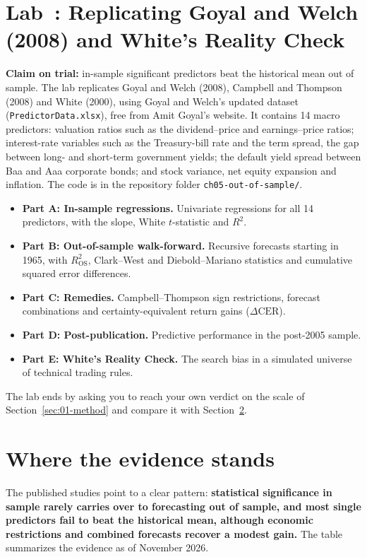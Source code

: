\section{Lab~\thechapter: Replicating Goyal and Welch (2008) and White's Reality Check}
\label{sec:09-lab}

\textbf{Claim on trial:} in-sample significant predictors beat the historical mean out of sample. The lab replicates Goyal and Welch (2008), Campbell and Thompson (2008) and White (2000), using Goyal and Welch's updated dataset (\texttt{PredictorData.xlsx}), free from Amit Goyal's website. It contains 14 macro predictors: valuation ratios such as the dividend--price and earnings--price ratios; interest-rate variables such as the Treasury-bill rate and the term spread, the gap between long- and short-term government yields; the default yield spread between Baa and Aaa corporate bonds; and stock variance, net equity expansion and inflation. The code is in the repository folder \texttt{ch05-out-of-sample/}.

\begin{itemize}
  \item \textbf{Part A: In-sample regressions.} Univariate regressions for all 14 predictors, with the slope, White $t$-statistic and $R^2$.
  \item \textbf{Part B: Out-of-sample walk-forward.} Recursive forecasts starting in 1965, with $R^2_{\text{OS}}$, Clark--West and Diebold--Mariano statistics and cumulative squared error differences.
  \item \textbf{Part C: Remedies.} Campbell--Thompson sign restrictions, forecast combinations and certainty-equivalent return gains ($\Delta \text{CER}$).
  \item \textbf{Part D: Post-publication.} Predictive performance in the post-2005 sample.
  \item \textbf{Part E: White's Reality Check.} The search bias in a simulated universe of technical trading rules.
\end{itemize}

The lab ends by asking you to reach your own verdict on the scale of Section~\ref{sec:01-method} and compare it with Section~\ref{sec:09-verdict}.

\section{Where the evidence stands}
\label{sec:09-verdict}

The published studies point to a clear pattern: \textbf{statistical significance in sample rarely carries over to forecasting out of sample, and most single predictors fail to beat the historical mean, although economic restrictions and combined forecasts recover a modest gain.} The table summarizes the evidence as of November 2026.

